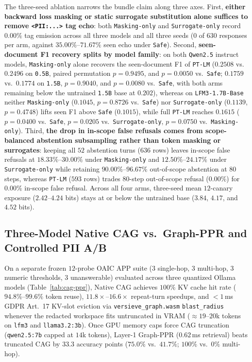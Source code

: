 \documentclass{article}
\begin{document}
The three-seed ablation narrows the bundle claim along three axes. First, \textbf{either backward loss masking or static surrogate substitution alone suffices to remove \texttt{<PII:...>} tag echo}: both \texttt{Masking-only} and \texttt{Surrogate-only} record $0.00\%$ tag emission across all three models and all three seeds ($0$ of $630$ responses per arm, against $35.00\%$--$71.67\%$ seen echo under \texttt{Safe}). Second, \textbf{seen-document F1 recovery splits by model family}: on both \texttt{Qwen2.5} instruct models, \texttt{Masking-only} alone recovers the seen-document F1 of \texttt{PT-LM} ($0.2508$ vs.\ $0.2496$ on \texttt{0.5B}, paired permutation $p = 0.9495$, and $p = 0.0050$ vs.\ \texttt{Safe}; $0.1759$ vs.\ $0.1774$ on \texttt{1.5B}, $p = 0.9040$, and $p = 0.0080$ vs.\ \texttt{Safe}, with both arms remaining below the untrained \texttt{1.5B} base at $0.202$), whereas on \texttt{LFM3-1.7B-Base} neither \texttt{Masking-only} ($0.1045$, $p = 0.8726$ vs.\ \texttt{Safe}) nor \texttt{Surrogate-only} ($0.1139$, $p = 0.4748$) lifts seen F1 above \texttt{Safe} ($0.1015$), while full \texttt{PT-LM} reaches $0.1615$ ($p = 0.0400$ vs.\ \texttt{Safe}, $p = 0.0205$ vs.\ \texttt{Surrogate-only}, $p = 0.0750$ vs.\ \texttt{Masking-only}). Third, \textbf{the drop in in-scope false refusals comes from scope-balanced abstention subsampling rather than token masking or surrogates}: keeping all $52$ abstention turns ($636$ rows) leaves in-scope false refusals at $18.33\%$--$30.00\%$ under \texttt{Masking-only} and $12.50\%$--$24.17\%$ under \texttt{Surrogate-only} while retaining $90.00\%$--$96.67\%$ out-of-scope abstention at $80$ steps, whereas \texttt{PT-LM} ($593$ rows) trades $80$-step out-of-scope refusal ($0.00\%$) for $0.00\%$ in-scope false refusal. Across all four arms, three-seed mean $12$-canary exposure ($2.42$--$4.24$ bits) stays at or below the untrained base ($3.84$, $4.17$, and $4.52$ bits).

\subsection{Three-Model Native CAG vs.\ Graph-PPR and Controlled PII A/B}
On a separate frozen $12$-probe OAIC APP suite ($3$ single-hop, $3$ multi-hop, $3$ numeric thresholds, $3$ unanswerable) evaluated across three quantized Ollama models (Table~\ref{tab:cag-ppr}), Native CAG achieves $100\%$ KV cache hit rate ($94.8\%$--$99.6\%$ token reuse), $11.8\times$--$16.6\times$ repeat-turn speedups, and $<1$\,ms GDPR Art.~17 KV-slot eviction via \texttt{versieve\_graph.wasm} \texttt{blast\_radius} whenever the redacted workspace fits untruncated in VRAM ($\approx 19$--$20$k tokens on \texttt{lfm3} and \texttt{llama3.2:3b}). Once GPU memory caps force CAG truncation (\texttt{qwen2.5:7b} capped at $14$k tokens), Layer-1 Graph-PPR ($0.62$\,ms retrieval) beats truncated CAG by $33.3$ accuracy points ($75.0\%$ vs.\ $41.7\%$; $100\%$ vs.\ $0\%$ multi-hop).
\end{document}
